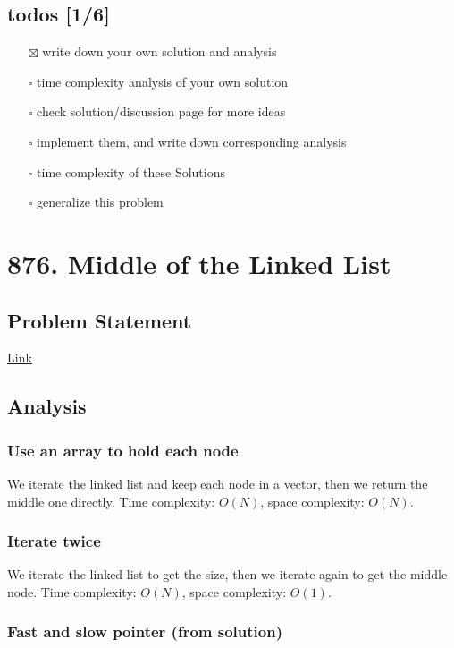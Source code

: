 \documentclass[12pt]{article}
\begin{document}
\subsection{todos [1/6]}
\label{sec:org7394c77}
\begin{itemize}
\item[{$\boxtimes$}] write down your own solution and analysis
\item[{$\square$}] time complexity analysis of your own solution
\item[{$\square$}] check solution/discussion page for more ideas
\item[{$\square$}] implement them, and write down corresponding analysis
\item[{$\square$}] time complexity of these Solutions
\item[{$\square$}] generalize this problem
\end{itemize}
\section{876. Middle of the Linked List}
\label{sec:org3897514}
\subsection{Problem Statement}
\label{sec:org1e061f9}
\href{https://leetcode.com/problems/middle-of-the-linked-list/}{Link}
\subsection{Analysis}
\label{sec:orgd8d231f}
\subsubsection{Use an array to hold each node}
\label{sec:org88953c3}
We iterate the linked list and keep each node in a vector, then we return the middle one directly. Time complexity: \(O(N)\), space complexity: \(O(N)\).
\subsubsection{Iterate twice}
\label{sec:org8edfed7}
We iterate the linked list to get the size, then we iterate again to get the middle node. Time complexity: \(O(N)\), space complexity: \(O(1)\).
\subsubsection{Fast and slow pointer (from solution)}
\label{sec:orgd50a238}
\end{document}
